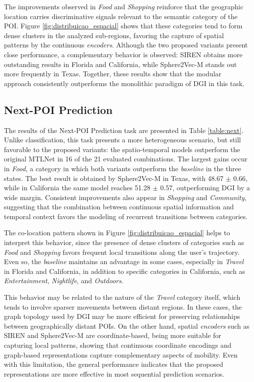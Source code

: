 The improvements observed in \textit{Food} and \textit{Shopping} reinforce that the geographic location carries discriminative signals relevant to the semantic category of the POI. Figure \ref{fig:distribuicao_espacial} shows that these categories tend to form dense clusters in the analyzed sub-regions, favoring the capture of spatial patterns by the continuous \textit{encoders}. Although the two proposed variants present close performance, a complementary behavior is observed: SIREN obtains more outstanding results in Florida and California, while Sphere2Vec-M stands out more frequently in Texas. Together, these results show that the modular approach consistently outperforms the monolithic paradigm of DGI in this task.



\subsection{Next-POI Prediction}

The results of the Next-POI Prediction task are presented in Table \ref{table:next}. Unlike classification, this task presents a more heterogeneous scenario, but still favorable to the proposed variants: the spatio-temporal models outperform the original MTLNet in 16 of the 21 evaluated combinations. The largest gains occur in \textit{Food}, a category in which both variants outperform the \textit{baseline} in the three states. The best result is obtained by Sphere2Vec-M in Texas, with 48.67 $\pm$ 0.66, while in California the same model reaches 51.28 $\pm$ 0.57, outperforming DGI by a wide margin. Consistent improvements also appear in \textit{Shopping} and \textit{Community}, suggesting that the combination between continuous spatial information and temporal context favors the modeling of recurrent transitions between categories.

The co-location pattern shown in Figure \ref{fig:distribuicao_espacial} helps to interpret this behavior, since the presence of dense clusters of categories such as \textit{Food} and \textit{Shopping} favors frequent local transitions along the user's trajectory. Even so, the \textit{baseline} maintains an advantage in some cases, especially in \textit{Travel} in Florida and California, in addition to specific categories in California, such as \textit{Entertainment}, \textit{Nightlife}, and \textit{Outdoors}.

This behavior may be related to the nature of the \textit{Travel} category itself, which tends to involve sparser movements between distant regions. In these cases, the graph topology used by DGI may be more efficient for preserving relationships between geographically distant POIs. On the other hand, spatial \textit{encoders} such as SIREN and Sphere2Vec-M are coordinate-based, being more suitable for capturing local patterns, showing that continuous coordinate encodings and graph-based representations capture complementary aspects of mobility. Even with this limitation, the general performance indicates that the proposed representations are more effective in most sequential prediction scenarios.
